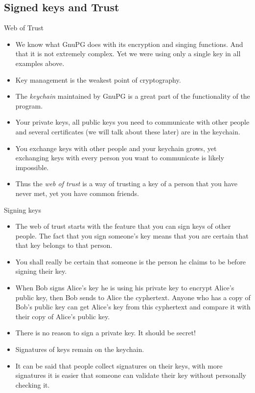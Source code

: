 \documentclass[hyperref={colorlinks=true}]{beamer}
\begin{document}
\subsection{Signed keys and Trust}
\begin{frame}{Web of Trust}
  \begin{itemize}
    \item We know what GnuPG does with its encryption and singing functions.
And that it is not extremely complex.  Yet we were using only a single key in
all examples above.
    \item Key management is the weakest point of cryptography.
    \item The \emph{keychain} maintained by GnuPG is a great part of the
functionality of the program.
    \item Your private keys, all public keys you need to communicate with other
people and several certificates (we will talk about these later) are in the
keychain.
    \item You exchange keys with other people and your keychain grows, yet
exchanging keys with every person you want to communicate is likely impossible.
    \item Thus the \emph{web of trust} is a way of trusting a key of a person
that you have never met, yet you have common friends.
  \end{itemize}
\end{frame}

\begin{frame}{Signing keys}
  \begin{itemize}
    \item The web of trust starts with the feature that you can sign keys of
other people.  The fact that you sign someone's key means that you are certain
that that key belongs to that person.
    \item You shall really be certain that someone is the person he claims to
be before signing their key.
    \item When Bob signs Alice's key he is using his private key to encrypt
Alice's public key, then Bob sends to Alice the cyphertext.  Anyone who has a
copy of Bob's public key can get Alice's key from this cyphertext and compare
it with their copy of Alice's public key.
    \item There is no reason to sign a private key.  It should be secret!
    \item Signatures of keys remain on the keychain.
    \item It can be said that people collect signatures on their keys, with
more signatures it is easier that someone can validate their key without
personally checking it.
  \end{itemize}
\end{frame}
\end{document}
